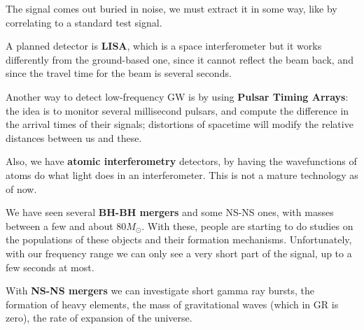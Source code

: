 \documentclass[main.tex]{subfiles}
\begin{document}
The signal comes out buried in noise, we must extract it in some way, like by correlating to a standard test signal.

A planned detector is \textbf{LISA}, which is a space interferometer but it works differently from the ground-based one, since it cannot reflect the beam back, and since the travel time for the beam is several seconds. 

Another way to detect low-frequency GW is by using \textbf{Pulsar Timing Arrays}: the idea is to monitor several millisecond pulsars, and compute the difference in the arrival times of their signals; distortions of spacetime will modify the relative distances between us and these. 

Also, we have \textbf{atomic interferometry} detectors, by having the wavefunctions of atoms do what light does in an interferometer.
This is not a mature technology as of now. 

We have seen several \textbf{BH-BH mergers} and some NS-NS ones, with masses between a few and about \(80 M_{\odot}\). With these, people are starting to do studies on the populations of these objects and their formation mechanisms. 
Unfortunately, with our frequency range we can only see a very short part of the signal, up to a few seconds at most. 

With \textbf{NS-NS mergers} we can investigate short gamma ray bursts, the formation of heavy elements, the mass of gravitational waves (which in GR is zero), the rate of expansion of the universe.
\end{document}
